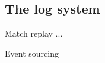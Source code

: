 \documentclass{beamer}
\begin{document}
\subsection{The log system}
\begin{frame}{Match replay}
...
\end{frame}
\begin{frame}{Event sourcing}
\end{frame}
\end{document}
